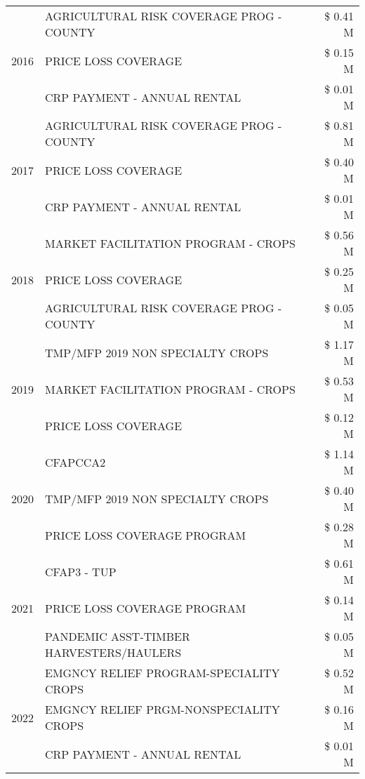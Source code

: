 \begin{tabular}{llr}
\cline{1-3}
\multirow[t]{3}{*}{2016} & AGRICULTURAL RISK COVERAGE PROG - COUNTY & \$ 0.41 M \\
 & PRICE LOSS COVERAGE & \$ 0.15 M \\
 & CRP PAYMENT - ANNUAL RENTAL & \$ 0.01 M \\
\cline{1-3}
\multirow[t]{3}{*}{2017} & AGRICULTURAL RISK COVERAGE PROG - COUNTY & \$ 0.81 M \\
 & PRICE LOSS COVERAGE & \$ 0.40 M \\
 & CRP PAYMENT - ANNUAL RENTAL & \$ 0.01 M \\
\cline{1-3}
\multirow[t]{3}{*}{2018} & MARKET FACILITATION PROGRAM - CROPS & \$ 0.56 M \\
 & PRICE LOSS COVERAGE & \$ 0.25 M \\
 & AGRICULTURAL RISK COVERAGE PROG - COUNTY & \$ 0.05 M \\
\cline{1-3}
\multirow[t]{3}{*}{2019} & TMP/MFP 2019 NON SPECIALTY CROPS & \$ 1.17 M \\
 & MARKET FACILITATION PROGRAM - CROPS & \$ 0.53 M \\
 & PRICE LOSS COVERAGE & \$ 0.12 M \\
\cline{1-3}
\multirow[t]{3}{*}{2020} & CFAPCCA2 & \$ 1.14 M \\
 & TMP/MFP 2019 NON SPECIALTY CROPS & \$ 0.40 M \\
 & PRICE LOSS COVERAGE PROGRAM & \$ 0.28 M \\
\cline{1-3}
\multirow[t]{3}{*}{2021} & CFAP3 - TUP & \$ 0.61 M \\
 & PRICE LOSS COVERAGE PROGRAM & \$ 0.14 M \\
 & PANDEMIC ASST-TIMBER HARVESTERS/HAULERS & \$ 0.05 M \\
\cline{1-3}
\multirow[t]{3}{*}{2022} & EMGNCY RELIEF PROGRAM-SPECIALITY CROPS & \$ 0.52 M \\
 & EMGNCY RELIEF PRGM-NONSPECIALITY CROPS & \$ 0.16 M \\
 & CRP PAYMENT - ANNUAL RENTAL & \$ 0.01 M \\
\cline{1-3}
\bottomrule
\end{tabular}
